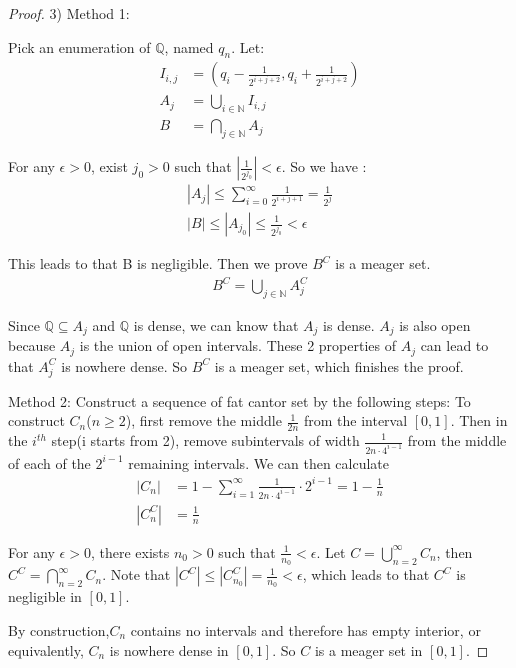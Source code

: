 \documentclass[a4paper, linespread=1.5]{article}
\begin{document}
\begin{proof}
		3) Method 1:
		
		Pick an enumeration of $\mathbb{Q}$, named $q_n$. Let:
		\begin{align*}
			I_{i,j}&=(q_i-\frac{1}{2^{i+j+2}},q_i+\frac{1}{2^{i+j+2}})\\
			A_j&=\bigcup\limits_{i\in \mathbb{N}}I_{i,j}\\
			B&=\bigcap\limits_{j\in\mathbb{N}}A_j
		\end{align*}
		
		For any $\epsilon>0$, exist $j_0>0$ such that $|\frac{1}{2^{j_0}}|<\epsilon$. So we have :
		\begin{align*}
			|A_j|\le \sum_{i=0}^{\infty} \frac{1}{2^{i+j+1}}=\frac{1}{2^j} \\
			|B|\le|A_{j_0}|\le \frac{1}{2^{j_0}} < \epsilon
		\end{align*}
		
		This leads to that B is negligible. Then we prove $B^C$ is a meager set.
		\begin{align*}
			B^C=\bigcup\limits_{j\in\mathbb{N}}A_j^C
		\end{align*}
		
		Since $\mathbb{Q}\subseteq A_j$ and $\mathbb{Q}$ is dense, we can know that $A_j$ is dense. $A_j$ is also open because $A_j$ is the union of open intervals. These 2 properties of $A_j$ can lead to that $A_j^C$ is nowhere dense. So $B^C$ is a meager set, which finishes the proof.
		
		Method 2:
		Construct a sequence of fat cantor set by the following steps: To construct $C_n$($n\ge2$), first remove the middle $\frac{1}{2n}$ from the interval $[0,1]$. Then in the $i^{th}$ step(i starts from 2), remove subintervals of width $\frac{1}{2n\cdot4^{i-1}}$ from the middle of each of the $2^{i-1}$ remaining intervals. We can then calculate 
		\begin{align*}
			|C_n|&=1-\sum_{i=1}^{\infty}{\frac{1}{2n\cdot4^{i-1}}\cdot2^{i-1}=1-\frac{1}{n}}\\
			|C_n^C|&=\frac{1}{n}
		\end{align*}
		
		For any $\epsilon>0$, there exists $n_0>0$ such that $\frac{1}{n_0}<\epsilon$. Let $C= \bigcup\limits_{n=2}^{\infty}C_n$, then $C^C=\bigcap\limits_{n=2}^{\infty}C_n$. Note that $|C^C|\le|C_{n_0}^C|=\frac{1}{n_0}<\epsilon$, which leads to that $C^C$ is negligible in $[0,1]$.
		
		By construction,$C_n$ contains no intervals and therefore has empty interior, or equivalently, $C_n$ is nowhere dense in $[0,1]$. So $C$ is a meager set in $[0,1]$. 
		

\end{proof}
\end{document}
